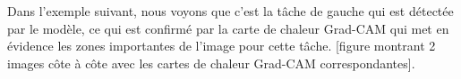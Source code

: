 \documentclass[a4paper]{article}
\begin{document}
Dans l'exemple suivant, nous voyons que c'est la tâche de gauche qui est détectée par le modèle, ce qui est confirmé par la carte de chaleur Grad-CAM qui met en évidence les zones importantes de l'image pour cette tâche.
[figure montrant 2 images côte à côte avec les cartes de chaleur Grad-CAM correspondantes].
\end{document}
